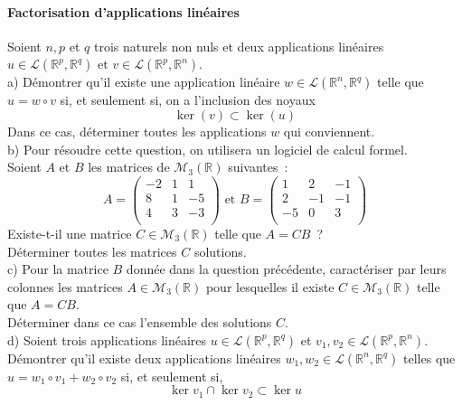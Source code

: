\documentclass[a4paper,10pt]{article}
\begin{document}
\paragraph{Factorisation d'applications linéaires}
Soient $n,p$ et $q$ trois naturels non nuls et deux applications linéaires $u
\in {\mathcal{L}}(\mathbb{R}^p ,\mathbb{R}^q )$ et $v \in
{\mathcal{L}}(\mathbb{R}^p ,\mathbb{R}^n )$.\\
a) Démontrer qu'il existe une application linéaire $w \in
{\mathcal{L}}(\mathbb{R}^n ,\mathbb{R}^q )$ telle que $u = w \circ v$ si, et
seulement si, on a l'inclusion des noyaux
$$\ker (v) \subset \ker (u)$$
Dans ce cas, déterminer toutes les applications $w$ qui conviennent.\\
b) Pour résoudre cette question, on utilisera un logiciel de calcul formel.\\
Soient $A$ et $B$ les matrices de ${\mathcal{M}}_3 (\mathbb{R})$ suivantes~:
$$A = \left( {
\begin{array}{ccc}
 { - 2} & 1 & 1  \\
 8 & 1 & { - 5}  \\
 4 & 3 & { - 3}  \\
\end{array}
} \right)\text{ et }B = \left( {
\begin{array}{ccc}
 1 & 2 & { - 1}  \\
 2 & { - 1} & { - 1}  \\
 { - 5} & 0 & 3  \\
\end{array}
} \right)$$
Existe-t-il une matrice $C \in {\mathcal{M}}_3 (\mathbb{R})$ telle que $A =
CB$~?\\
Déterminer toutes les matrices $C$ solutions.\\
c) Pour la matrice $B$ donnée dans la question précédente, caractériser par
leurs colonnes les matrices $A \in {\mathcal{M}}_3 (\mathbb{R})$ pour lesquelles
il existe $C \in {\mathcal{M}}_3 (\mathbb{R})$ telle que $A = CB$.\\
Déterminer dans ce cas l'ensemble des solutions $C$.\\
d) Soient trois applications linéaires $u \in {\mathcal{L}}(\mathbb{R}^p
,\mathbb{R}^q )$ et $v_1 ,v_2  \in {\mathcal{L}}(\mathbb{R}^p ,\mathbb{R}^n )$.
Démontrer qu'il existe deux applications linéaires $w_1 ,w_2  \in
{\mathcal{L}}(\mathbb{R}^n ,\mathbb{R}^q )$ telles que $u = w_1  \circ v_1  +
w_2  \circ v_2 $ si, et seulement si,
$$\ker v_1  \cap \ker v_2  \subset \ker u$$
\end{document}
